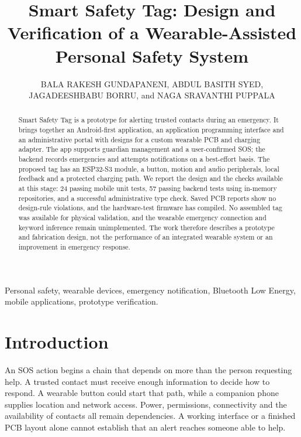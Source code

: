 \documentclass[nolineno]{ieeeaccess}
\begin{document}
\vol{--}
\title{Smart Safety Tag: Design and Verification of a Wearable-Assisted Personal Safety System}
\author{\uppercase{Bala Rakesh Gundapaneni}, \uppercase{Abdul Basith Syed}, \uppercase{Jagadeeshbabu Borru}, and \uppercase{Naga Sravanthi Puppala}}
\address{Affiliations and corresponding author details to be confirmed.}
\begin{abstract}
Smart Safety Tag is a prototype for alerting trusted contacts during an emergency. It brings together an Android-first application, an application programming interface and an administrative portal with designs for a custom wearable PCB and charging adapter. The app supports guardian management and a user-confirmed SOS; the backend records emergencies and attempts notifications on a best-effort basis. The proposed tag has an ESP32-S3 module, a button, motion and audio peripherals, local feedback and a protected charging path. We report the design and the checks available at this stage: 24 passing mobile unit tests, 57 passing backend tests using in-memory repositories, and a successful administrative type check. Saved PCB reports show no design-rule violations, and the hardware-test firmware has compiled. No assembled tag was available for physical validation, and the wearable emergency connection and keyword inference remain unimplemented. The work therefore describes a prototype and fabrication design, not the performance of an integrated wearable system or an improvement in emergency response.
\end{abstract}
\begin{keywords}Personal safety, wearable devices, emergency notification, Bluetooth Low Energy, mobile applications, prototype verification.\end{keywords}
\maketitle
\raggedbottom
\section{Introduction}
An SOS action begins a chain that depends on more than the person requesting help. A trusted contact must receive enough information to decide how to respond. A wearable button could start that path, while a companion phone supplies location and network access. Power, permissions, connectivity and the availability of contacts all remain dependencies. A working interface or a finished PCB layout alone cannot establish that an alert reaches someone able to help.
\end{document}
